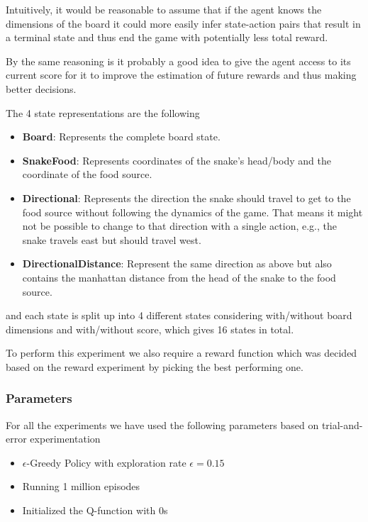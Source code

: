\documentclass[report.tex]{subfiles}
\begin{document}
    Intuitively, it would be reasonable to assume that if the agent knows the dimensions of the board it could more easily infer state-action pairs that result in a terminal state and thus end the game with potentially less total reward.

    By the same reasoning is it probably a good idea to give the agent access to its current score for it to improve the estimation of future rewards and thus making better decisions.

    The 4 state representations are the following

    \begin{itemize}
        \item \textbf{Board}: Represents the complete board state.
        \item \textbf{SnakeFood}: Represents coordinates of the snake's head/body and the coordinate of the food source.
        \item \textbf{Directional}: Represents the direction the snake should travel to get to the food source without following the dynamics of the game. That means it might not be possible to change to that direction with a single action, e.g., the snake travels east but should travel west.
        \item \textbf{DirectionalDistance}: Represent the same direction as above but also contains the manhattan distance from the head of the snake to the food source.
    \end{itemize}

    and each state is split up into 4 different states considering with/without board dimensions and with/without score, which gives 16 states in total.

    To perform this experiment we also require a reward function which was decided based on the reward experiment by picking the best performing one.

    \subsubsection*{Parameters}

    For all the experiments we have used the following parameters based on trial-and-error experimentation

    \begin{itemize}
        \item $\epsilon$-Greedy Policy with exploration rate $\epsilon = 0.15$
        \item Running 1 million episodes
        \item Initialized the Q-function with 0s
    \end{itemize}
\end{document}
